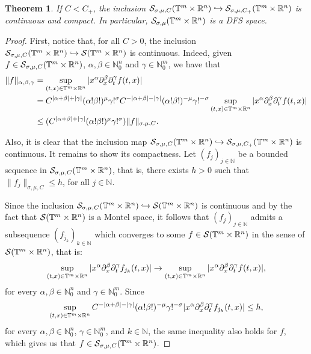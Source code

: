 \documentclass[11pt,reqno]{amsart}
\newtheorem{theorem}{Theorem}[section]
\numberwithin{equation}{section}
\theoremstyle{definition}
\theoremstyle{definition}
\newcommand{\G}{\mathnormal{\mathbb{T}^{m}\times\mathbb{R}^n}}
\newcommand{\N}{\mathbb{N}}
\renewcommand{\S}{\mathcal{S}_{\sigma,\mu}(\G)}
\newcommand{\SC}{\mathcal{S}_{\sigma,\mu,C}(\G)}
\begin{document}
\begin{theorem}\label{comp_inc}
    If $C<C_+$, the inclusion $\mathcal{S}_{\sigma,\mu,C}(\G)\hookrightarrow \mathcal{S}_{\sigma,\mu,C_+}(\G)$ is continuous and compact. In particular, $\S$ is a DFS space.
\end{theorem}
\begin{proof}
    First, notice that, for all $C>0$, the inclusion $\SC\hookrightarrow\mathcal{S}(\G)$ is continuous. Indeed, given $f\in\SC$,  $\alpha,\beta\in\mathbb{N}_0^n$ and $\gamma\in\mathbb{N}_0^m$, we have that
    \begin{align*}
        \|f\|_{\alpha,\beta,\gamma} & = \sup_{(t,x)\in \G}|x^\alpha\partial_x^\beta\partial_t^\gamma f(t,x)|\\
        & = C^{|\alpha+\beta|+|\gamma|}(\alpha!\beta!)^{\mu}\gamma!^\sigma C^{-|\alpha+\beta|-|\gamma|}(\alpha!\beta!)^{-\mu}\gamma!^{-\sigma}\sup_{(t,x)\in \G}|x^\alpha\partial_x^\beta\partial_t^\gamma f(t,x)|\\
        & \leq  (C^{|\alpha+\beta|+|\gamma|}(\alpha!\beta!)^{\mu}\gamma!^\sigma)\|f\|_{\sigma,\mu,C}.
    \end{align*}

    Also, it is clear that the inclusion map $\mathcal{S}_{\sigma,\mu,C}(\G)\hookrightarrow \mathcal{S}_{\sigma,\mu,C_+}(\G)$ is continuous. It remains to show its compactness. Let $(f_j)_{j\in\N}$ be a bounded sequence in $\SC$, that is, there exists $h>0$ such that $\|f_j\|_{\sigma,\mu,C}\leq h$, for all $j\in\mathbb{N}$. 
    
    Since the inclusion $\SC\hookrightarrow\mathcal{S}(\G)$ is continuous and by the fact that $\mathcal{S}(\G)$ is a Montel space, it follows that $(f_j)_{j\in\N}$ admits a subsequence $(f_{j_k})_{k\in\N}$ which converges to some $f\in\mathcal{S}(\G)$ in the sense of $\mathcal{S}(\G)$, that is:
    \[\sup_{(t,x)\in\G}|x^\alpha\partial_x^\beta\partial_t^\gamma f_{j_k}(t,x)| \to \sup_{(t,x)\in \G}|x^\alpha\partial_x^\beta\partial_t^\gamma f(t,x)|,\]
    for every $\alpha,\beta\in\mathbb{N}_0^n$ and $\gamma\in\mathbb{N}_0^m$. 
    Since
    \[\sup_{(t,x)\in \G}C^{-|\alpha+\beta|-|\gamma|}(\alpha!\beta!)^{-\mu}\gamma!^{-\sigma}|x^\alpha\partial_x^\beta\partial_t^\gamma f_{j_k}(t,x)| \leq h,\]
    for every $\alpha,\beta\in\mathbb{N}_0^n$, $\gamma\in\mathbb{N}_0^m$, and $k\in\mathbb{N}$, the same inequality also holds for $f$, which gives us that $f\in\SC$.
    

\end{proof}
\end{document}
